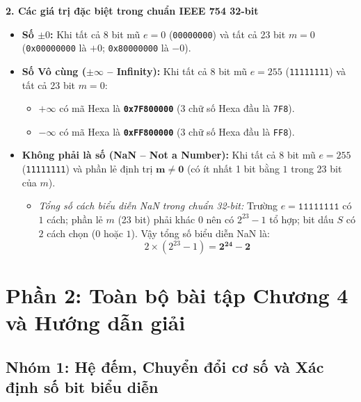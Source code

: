 \textbf{2. Các giá trị đặc biệt trong chuẩn IEEE 754 32-bit}
\begin{itemize}
    \item \textbf{Số $\pm 0$:} Khi tất cả 8 bit mũ $e = 0$ (\texttt{00000000}) và tất cả 23 bit $m = 0$ (\texttt{0x00000000} là $+0$; \texttt{0x80000000} là $-0$).
    \item \textbf{Số Vô cùng ($\pm \infty$ -- Infinity):} Khi tất cả 8 bit mũ $e = 255$ (\texttt{11111111}) và tất cả 23 bit $m = 0$:
    \begin{itemize}
        \item $+\infty$ có mã Hexa là \textbf{\texttt{0x7F800000}} (3 chữ số Hexa đầu là \texttt{7F8}).
        \item $-\infty$ có mã Hexa là \textbf{\texttt{0xFF800000}} (3 chữ số Hexa đầu là \texttt{FF8}).
    \end{itemize}
    \item \textbf{Không phải là số (NaN -- Not a Number):} Khi tất cả 8 bit mũ $e = 255$ (\texttt{11111111}) và phần lẻ định trị $\mathbf{m \neq 0}$ (có ít nhất 1 bit bằng $1$ trong 23 bit của $m$).
    \begin{itemize}
        \item \textit{Tổng số cách biểu diễn NaN trong chuẩn 32-bit:} Trường $e = \texttt{11111111}$ có $1$ cách; phần lẻ $m$ (23 bit) phải khác $0$ nên có $2^{23} - 1$ tổ hợp; bit dấu $S$ có $2$ cách chọn ($0$ hoặc $1$). Vậy tổng số biểu diễn NaN là:
        $$2 \times (2^{23} - 1) = \mathbf{2^{24} - 2}$$
    \end{itemize}
\end{itemize}

\newpage
\section{Phần 2: Toàn bộ bài tập Chương 4 và Hướng dẫn giải}

\subsection{Nhóm 1: Hệ đếm, Chuyển đổi cơ số và Xác định số bit biểu diễn}


